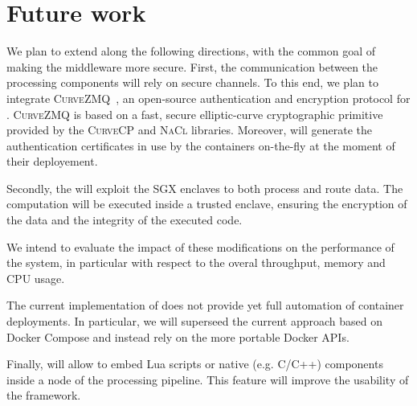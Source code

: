 \section{Future work}
\label{sec:future}


We plan to extend \SYS along the following directions, with the common goal of making the middleware more secure.
First, the communication between the processing components will rely on secure channels. 
To this end, we plan to integrate \textsc{CurveZMQ}~\cite{zmq:curvezmq}, an open-source authentication and encryption protocol for \zmq.
\textsc{CurveZMQ} is based on a fast, secure elliptic-curve cryptographic primitive provided by the \textsc{CurveCP}\cite{zmq:curvecp} and \textsc{NaCl}\cite{zmq:nacl} libraries.
Moreover, \SYS will generate the authentication certificates in use by the containers on-the-fly at the moment of their deployement.

Secondly, the \SYS will exploit the SGX enclaves to both process and route data.
The computation will be executed inside a trusted enclave, ensuring the encryption of the data and the integrity of the executed code.

We intend to evaluate the impact of these modifications on the performance of the system, in particular with respect to the overal throughput, memory and CPU usage.

The current implementation of \SYS does not provide yet full automation of container deployments.
In particular, we will superseed the current approach based on Docker Compose and instead rely on the more portable Docker APIs.

Finally, \SYS will allow to embed Lua scripts or native (e.g. C/C++) components inside a node of the processing pipeline.
This feature will improve the usability of the framework.
